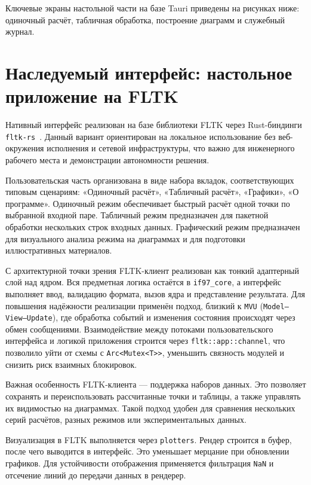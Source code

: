 	Ключевые экраны настольной части на базе Tauri приведены на рисунках ниже:
	одиночный расчёт, табличная обработка, построение диаграмм и служебный журнал.

\section{Наследуемый интерфейс: настольное приложение на FLTK}

	Нативный интерфейс реализован на базе библиотеки FLTK через Rust-биндинги \texttt{fltk-rs}~\cite{fltk_rs_docs}.  
Данный вариант ориентирован на локальное использование без веб-окружения исполнения и сетевой инфраструктуры,
что важно для инженерного рабочего места и демонстрации автономности решения.  

Пользовательская часть организована в виде набора вкладок,
соответствующих типовым сценариям:
«Одиночный расчёт», «Табличный расчёт», «Графики», «О программе».  
Одиночный режим обеспечивает быстрый расчёт одной точки по выбранной входной паре.  
Табличный режим предназначен для пакетной обработки нескольких строк входных данных.  
Графический режим предназначен для визуального анализа режима на диаграммах и для подготовки иллюстративных материалов.  

	С архитектурной точки зрения FLTK-клиент реализован как тонкий адаптерный слой над ядром.  
Вся предметная логика остаётся в \texttt{if97\_core}, а интерфейс выполняет ввод, валидацию формата, вызов ядра и представление результата.  
	Для повышения надёжности реализации применён подход, близкий к \texttt{MVU} (\texttt{Model--View--Update}),
	где обработка событий и изменения состояния происходят через обмен сообщениями.  
Взаимодействие между потоками пользовательского интерфейса и логикой приложения строится через \texttt{fltk::app::channel},
что позволило уйти от схемы с \texttt{Arc<Mutex<T>>},
уменьшить связность модулей и снизить риск взаимных блокировок.  

	Важная особенность FLTK-клиента --- поддержка наборов данных.  
Это позволяет сохранять и переиспользовать рассчитанные точки и таблицы,
а также управлять их видимостью на диаграммах.  
Такой подход удобен для сравнения нескольких серий расчётов, разных режимов или экспериментальных данных.  

	Визуализация в FLTK выполняется через \texttt{plotters}.
Рендер строится в буфер, после чего выводится в интерфейс.
Это уменьшает мерцание при обновлении графиков.
Для устойчивости отображения применяется фильтрация \texttt{NaN}
и отсечение линий до передачи данных в рендерер.

